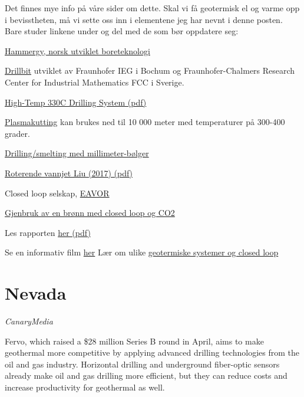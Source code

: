 \documentclass[
]{book}
\begin{document}
Det finnes mye info på våre sider om dette. Skal vi få geotermisk el og varme opp i bevisstheten, må vi sette oss inn i elementene jeg har nevnt i denne posten. Bare studer linkene under og del med de som bør oppdatere seg:

\href{https://www.tu.no/artikler/den-norske-oppfinneren-har-en-visjon-om-at-kinesiske-kullkraftverk-kan-bygges-om-til-geotermiske-kraftverk/376346}{Hammergy, norsk utviklet boreteknologi}

\href{https://techxplore.com/news/2022-01-micro-drilling-turbines-efficiency-geothermal.html}{Drillbit} utviklet av Fraunhofer IEG i Bochum og Fraunhofer-Chalmers Research Center for Industrial Mathematics FCC i Sverige.

\href{pdf/high_macpherson_ht_directional_drilling.pdf}{High-Temp 330C Drilling System (pdf)}

\href{https://www.euractiv.com/section/energy/opinion/european-technology-unlocking-deep-geothermal-energy-for-all/}{Plasmakutting} kan brukes ned til 10 000 meter med temperaturer på 300-400 grader.

\href{https://www.journals.elsevier.com/renewable-energy-focus}{Drilling/smelting med millimeter-bølger}

\href{pdf/Liu_2017_Drilling_Water_Jet.pdf}{Roterende vannjet Liu (2017) (pdf)}

Closed loop selskap, \href{https://www.euractiv.com/section/energy/news/closed-loop-technology-brings-promise-of-geothermal-anywhere/}{EAVOR}

\href{https://www.greenfireenergy.com/how-does-geothermal-energy-work/}{Gjenbruk av en brønn med closed loop og CO2}

Les rapporten \href{pdf/Almaya_2020_Closed_Loop_geothermal.pdf}{her (pdf)}

Se en informativ film \href{https://youtu.be/g0sHVsC1cF4}{her}
Lær om ulike \href{https://youtu.be/PtQmGPmyLA0}{geotermiske systemer og closed loop}

\hypertarget{nevada}{%
\section{Nevada}\label{nevada}}

\emph{CanaryMedia}

Fervo, which raised a \$28 million Series B round in April, aims to make geothermal more competitive by applying advanced drilling technologies from the oil and gas industry. Horizontal drilling and underground fiber-optic sensors already make oil and gas drilling more efficient, but they can reduce costs and increase productivity for geothermal as well.
\end{document}
